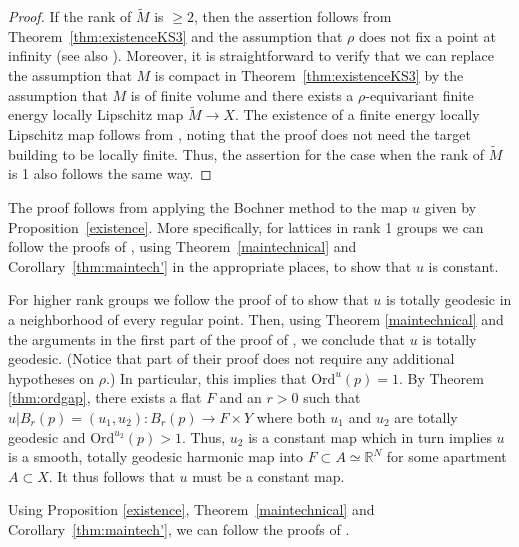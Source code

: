 \documentclass[12pt]{amsart}
\theoremstyle{definition}
\newenvironment{proof_of_main_theorem2}
{{\it Proof of  Theorem~\ref{maintheorem}.}}
{\hfill $\Box$ \\}
\newenvironment{proof_of_main_theorem3}
{{\it Proof of  Theorem~\ref{maintheorem'}.}}
{\hfill $\Box$ \\}
\numberwithin{equation}{section}
\newcommand{\R}{\mathbb R}
\begin{document}
\begin{proof}
If the rank of $\widetilde M$ is $\geq 2$, then the assertion follows from Theorem~\ref{thm:existenceKS3} and the assumption that $\rho$ does not fix a point at infinity (see also \cite[Corollary 3.6]{jost}).  Moreover, it is straightforward to verify that  we can replace the assumption that $M$ is compact  in Theorem~\ref{thm:existenceKS3} by the assumption that $M$ is of finite volume and there exists a $\rho$-equivariant finite energy locally Lipschitz map $\widetilde M \rightarrow X$.  
The existence of a finite energy locally Lipschitz map follows from \cite[Lemma 8.1]{gromov-schoen}, noting that the proof does not need the target building to be locally finite.  Thus, the assertion for the case when the rank of $\widetilde M$ is 1 also follows the same way.
\end{proof}

\begin{proof_of_main_theorem2}
The proof follows from applying the Bochner method to the map $u$ given by Proposition~\ref{existence}.  More specifically, for lattices in rank 1 groups we can  follow the proofs of  \cite[Theorems 7.2 and~7.4]{gromov-schoen}, using Theorem~\ref{maintechnical} and Corollary~\ref{thm:maintech'} in the appropriate places, to show that $u$ is constant.

For higher rank groups we follow the proof of \cite[Lemma 15]{daskal-meseGAFA} to show that $u$ is totally geodesic in a neighborhood of every regular point. Then, using Theorem \ref{maintechnical} and the arguments in the first part of the proof of \cite[Theorem 1]{daskal-meseGAFA}, we conclude that $u$ is totally geodesic. (Notice that part of their proof does not require any additional hypotheses on $\rho$.) In particular, this implies that $\text{Ord}^u(p)=1$.  By Theorem \ref{thm:ordgap},  there exists a flat $F$ and an $r>0$ such that $u|B_r(p)=(u_1,u_2):B_r(p) \to F \times Y$ where both $u_1$ and $u_2$ are totally geodesic and $\text{Ord}^{u_2}(p)>1$.  Thus, $u_2$ is a constant map which in turn implies $u$ is a smooth, totally geodesic harmonic map into $F  \subset A \simeq \R^N$ for some apartment $A \subset X$. It thus follows that $u$ must be a constant map.
\end{proof_of_main_theorem2}


\begin{proof_of_main_theorem3}
Using Proposition \ref{existence}, Theorem~\ref{maintechnical} and Corollary~\ref{thm:maintech'}, we can follow the proofs of  \cite[Theorems 7.2 and 7.3]{gromov-schoen}.
\end{proof_of_main_theorem3}
\end{document}

